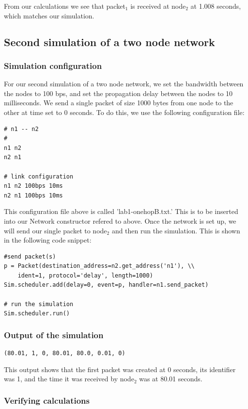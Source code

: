 \documentclass[fleqn,11pt]{article}
\begin{document}
From our calculations we see that packet$_1$ is received at node$_2$ at 1.008 seconds, which matches our simulation.

 \subsection{Second simulation of a two node network}
\subsubsection{Simulation configuration}
For our second simulation of a two node network, we set the bandwidth between the nodes to 100 bps, and set the propagation delay between the nodes to 10 milliseconds. We send a single packet of size 1000 bytes from one node to the other at time set to 0 seconds. To do this, we use the following configuration file:

\begin{lstlisting}
# n1 -- n2
#
n1 n2
n2 n1

# link configuration
n1 n2 100bps 10ms
n2 n1 100bps 10ms

\end{lstlisting}

This configuration file above is called 'lab1-onehopB.txt.' This is to be inserted into our Network constructor refered to above.
Once the network is set up, we will send our single packet to node$_2$ and then run the simulation. This is shown in the following code snippet:    

\begin{lstlisting}
#send packet(s)
p = Packet(destination_address=n2.get_address('n1'), \\
	ident=1, protocol='delay', length=1000)
Sim.scheduler.add(delay=0, event=p, handler=n1.send_packet)

# run the simulation
Sim.scheduler.run()
\end{lstlisting}

\subsubsection{Output of the simulation}
\begin{lstlisting}
(80.01, 1, 0, 80.01, 80.0, 0.01, 0)
\end{lstlisting}
This output shows that the first packet was created at 0 seconds, its identifier was 1, and the time it was received by node$_2$ was at 80.01 seconds.

\subsubsection{Verifying calculations}
\end{document}
